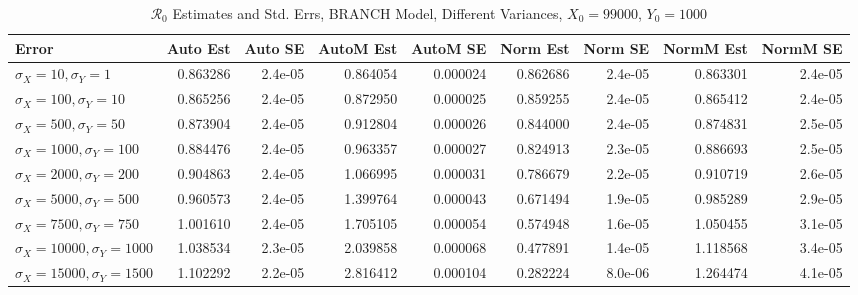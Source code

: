 \documentclass[12pt]{article}
\newcommand{\rr}{\ensuremath{\mathcal{R}_0}}
\begin{document}
\begin{table}[H]
	
	\caption{$\rr$ Estimates and Std. Errs, BRANCH Model, 
		Different Variances, $X_0 = 99000$, $Y_0 = 1000$}
	\begin{footnotesize}
		\hskip -1.7cm
		\begin{tabular}{l|r|r|r|r|r|r|r|r}
			\hline
			Error & Auto Est & Auto SE & AutoM Est & AutoM SE & Norm Est & Norm SE & NormM Est & NormM SE\\
			\hline
			$\sigma_X = 10, \sigma_Y = 1$ & 0.863286 & 2.4e-05 & 0.864054 & 0.000024 & 0.862686 & 2.4e-05 & 0.863301 & 2.4e-05\\
			\hline
			$\sigma_X = 100, \sigma_Y = 10$ & 0.865256 & 2.4e-05 & 0.872950 & 0.000025 & 0.859255 & 2.4e-05 & 0.865412 & 2.4e-05\\
			\hline
			$\sigma_X = 500, \sigma_Y = 50$ & 0.873904 & 2.4e-05 & 0.912804 & 0.000026 & 0.844000 & 2.4e-05 & 0.874831 & 2.5e-05\\
			\hline
			$\sigma_X = 1000, \sigma_Y = 100$ & 0.884476 & 2.4e-05 & 0.963357 & 0.000027 & 0.824913 & 2.3e-05 & 0.886693 & 2.5e-05\\
			\hline
			$\sigma_X = 2000, \sigma_Y = 200$ & 0.904863 & 2.4e-05 & 1.066995 & 0.000031 & 0.786679 & 2.2e-05 & 0.910719 & 2.6e-05\\
			\hline
			$\sigma_X = 5000, \sigma_Y = 500$ & 0.960573 & 2.4e-05 & 1.399764 & 0.000043 & 0.671494 & 1.9e-05 & 0.985289 & 2.9e-05\\
			\hline
			$\sigma_X = 7500, \sigma_Y = 750$ & 1.001610 & 2.4e-05 & 1.705105 & 0.000054 & 0.574948 & 1.6e-05 & 1.050455 & 3.1e-05\\
			\hline
			$\sigma_X = 10000, \sigma_Y = 1000$ & 1.038534 & 2.3e-05 & 2.039858 & 0.000068 & 0.477891 & 1.4e-05 & 1.118568 & 3.4e-05\\
			\hline
			$\sigma_X = 15000, \sigma_Y = 1500$ & 1.102292 & 2.2e-05 & 2.816412 & 0.000104 & 0.282224 & 8.0e-06 & 1.264474 & 4.1e-05\\
			\hline
		\end{tabular}
	\end{footnotesize}
\end{table}
\end{document}
